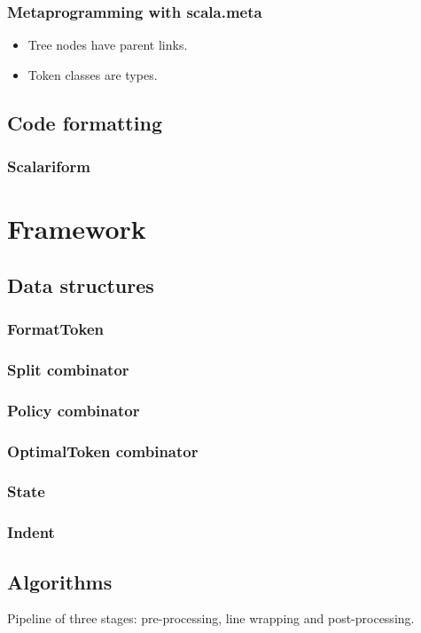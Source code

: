 \documentclass[11pt,a4paper]{article}
\begin{document}
\subsubsection{Metaprogramming with scala.meta}
\begin{itemize}
  \item Tree nodes have parent links.
  \item Token classes are types.
\end{itemize}
\subsection{Code formatting}
\subsubsection{Scalariform}
\section{Framework}
\subsection{Data structures}
\subsubsection{FormatToken}
\subsubsection{Split combinator}
\subsubsection{Policy combinator}
\subsubsection{OptimalToken combinator}
\subsubsection{State}
\subsubsection{Indent}
\subsection{Algorithms}
Pipeline of three stages: pre-processing, line wrapping and post-processing.
\end{document}
